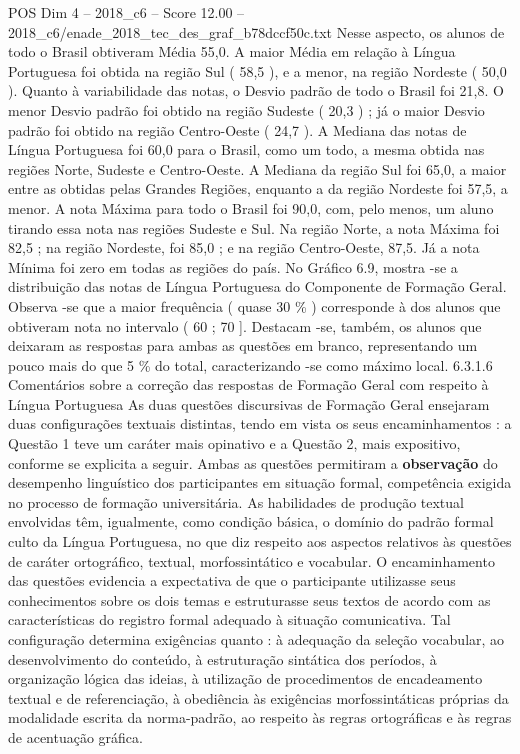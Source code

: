 \begin{textsample}{POS Dim 4 – 2018\_c6 – Score 12.00 – 2018\_c6/enade\_2018\_tec\_des\_graf\_b78dccf50c.txt}
Nesse aspecto, os alunos de todo o Brasil obtiveram Média 55,0.
A maior Média em relação à Língua Portuguesa foi obtida na região Sul ( 58,5 ), e a menor, na região Nordeste ( 50,0 ).
Quanto à variabilidade das notas, o Desvio padrão de todo o Brasil foi 21,8.
O menor Desvio padrão foi obtido na região Sudeste ( 20,3 ) ; já o maior Desvio padrão foi obtido na região Centro-Oeste ( 24,7 ).
A Mediana das notas de Língua Portuguesa foi 60,0 para o Brasil, como um todo, a mesma obtida nas regiões Norte, Sudeste e Centro-Oeste.
A Mediana da região Sul foi 65,0, a maior entre as obtidas pelas Grandes Regiões, enquanto a da região Nordeste foi 57,5, a menor.
A nota Máxima para todo o Brasil foi 90,0, com, pelo menos, um aluno tirando essa nota nas regiões Sudeste e Sul.
Na região Norte, a nota Máxima foi 82,5 ; na região Nordeste, foi 85,0 ; e na região Centro-Oeste, 87,5.
Já a nota Mínima foi zero em todas as regiões do país.
No Gráfico 6.9, mostra -se a distribuição das notas de Língua Portuguesa do Componente de Formação Geral.
Observa -se que a maior frequência ( quase 30 \% ) corresponde à dos alunos que obtiveram nota no intervalo ( 60 ; 70 ].
Destacam -se, também, os alunos que deixaram as respostas para ambas as questões em branco, representando um pouco mais do que 5 \% do total, caracterizando -se como máximo local. 6.3.1.6 Comentários sobre a correção das respostas de Formação Geral com respeito à Língua Portuguesa As duas questões discursivas de Formação Geral ensejaram duas configurações textuais distintas, tendo em vista os seus encaminhamentos : a Questão 1 teve um caráter mais opinativo e a Questão 2, mais expositivo, conforme se explicita a seguir.
Ambas as questões permitiram a \textbf{observação} do desempenho linguístico dos participantes em situação formal, competência exigida no processo de formação universitária.
As habilidades de produção textual envolvidas têm, igualmente, como condição básica, o domínio do padrão formal culto da Língua Portuguesa, no que diz respeito aos aspectos relativos às questões de caráter ortográfico, textual, morfossintático e vocabular.
O encaminhamento das questões evidencia a expectativa de que o participante utilizasse seus conhecimentos sobre os dois temas e estruturasse seus textos de acordo com as características do registro formal adequado à situação comunicativa.
Tal configuração determina exigências quanto : à adequação da seleção vocabular, ao desenvolvimento do conteúdo, à estruturação sintática dos períodos, à organização lógica das ideias, à utilização de procedimentos de encadeamento textual e de referenciação, à obediência às exigências morfossintáticas próprias da modalidade escrita da norma-padrão, ao respeito às regras ortográficas e às regras de acentuação gráfica.

\end{textsample}
